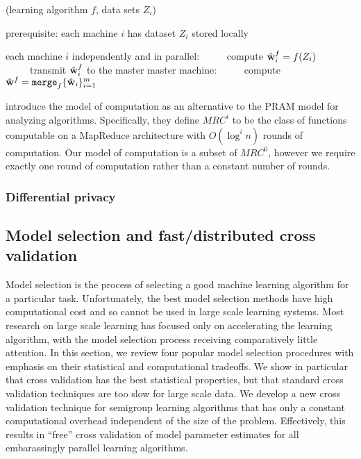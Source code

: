 \documentclass[thesis.tex]{subfiles}
\newcommand{\merge}{\mkprocedure{merge}}
\newcommand{\wf}{{\hat\w^{f}}}
\begin{document}
\begin{algorithm}
    \caption{(learning algorithm $f$, data sets $Z_i$)}
    \vspace{0.1in}
    prerequisite: each machine $i$ has dataset $Z_i$ stored locally
    \begin{algorithmic}[1]
        \State each machine $i$ independently and in parallel:
        \State ~~~~~compute $\wf_i = f(Z_i)$
        \State ~~~~~transmit $\wf_i$ to the master
        \State master machine:
        \State ~~~~~compute $\wf = \merge_f\{\what_i\}_{i=1}^m$
    \end{algorithmic}
\end{algorithm}

\cite{karloff2010model} introduce the  model of computation as an alternative to the PRAM model for analyzing algorithms.
Specifically, they define $MRC^i$ to be the class of functions computable on a MapReduce architecture with $O(\log^i n)$ rounds of computation.
Our model of computation is a subset of $MRC^0$,
however we require exactly one round of computation rather than a constant number of rounds.

\subsubsection{Differential privacy}


\subsection{Model selection and fast/distributed cross validation}

Model selection is the process of selecting a good machine learning algorithm for a particular task.
Unfortunately, the best model selection methods have high computational cost and so cannot be used in large scale learning systems.
Most research on large scale learning has focused only on accelerating the learning algorithm,
with the model selection process receiving comparatively little attention.
In this section, we review four popular model selection procedures with emphasis on their statistical and computational tradeoffs.
We show in particular that cross validation has the best statistical properties,
but that standard cross validation techniques are too slow for large scale data.
We develop a new cross validation technique for semigroup learning algorithms
that has only a constant computational overhead independent of the size of the problem.
Effectively, this results in ``free'' cross validation of model parameter estimates for all embarassingly parallel learning algorithms.
\end{document}
